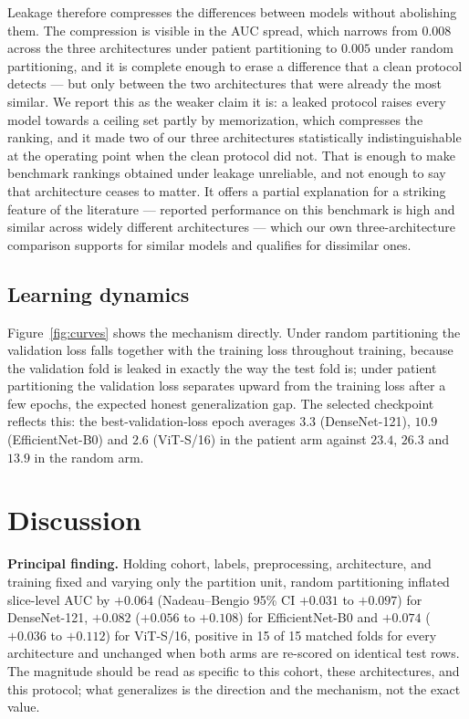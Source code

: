 \documentclass{ieeeaccess}
\begin{document}
Leakage therefore compresses the differences between models without abolishing them. The compression
is visible in the AUC spread, which narrows from $0.008$ across the three architectures under patient
partitioning to $0.005$ under random partitioning, and it is complete enough to erase a difference
that a clean protocol detects --- but only between the two architectures that were already the most
similar. We report this as the weaker claim it is: a leaked protocol raises every model towards a
ceiling set partly by memorization, which compresses the ranking, and it made two of our three
architectures statistically indistinguishable at the operating point when the clean protocol did not.
That is enough to make benchmark rankings obtained under leakage unreliable, and not enough to say
that architecture ceases to matter. It offers a partial explanation for a striking feature of the
literature --- reported performance on this benchmark is high and similar across widely different
architectures --- which our own three-architecture comparison supports for similar models and
qualifies for dissimilar ones.

\subsection{Learning dynamics}

Figure~\ref{fig:curves} shows the mechanism directly. Under random partitioning the validation loss
falls together with the training loss throughout training, because the validation fold is leaked in
exactly the way the test fold is; under patient partitioning the validation loss separates upward
from the training loss after a few epochs, the expected honest generalization gap. The selected
checkpoint reflects this: the best-validation-loss epoch averages $3.3$ (DenseNet-121), $10.9$
(EfficientNet-B0) and $2.6$ (ViT-S/16) in the patient arm against $23.4$, $26.3$ and $13.9$ in the
random arm.

\section{Discussion}
\textbf{Principal finding.} Holding cohort, labels, preprocessing, architecture, and training fixed
and varying only the partition unit, random partitioning inflated slice-level AUC by $+0.064$
(Nadeau--Bengio 95\% CI $+0.031$ to $+0.097$) for DenseNet-121, $+0.082$ ($+0.056$ to $+0.108$)
for EfficientNet-B0 and $+0.074$ ($+0.036$ to $+0.112$) for ViT-S/16, positive in 15 of 15 matched
folds for every architecture and unchanged when
both arms are re-scored on identical test rows. The magnitude should be read as specific to this
cohort, these architectures, and this protocol; what generalizes is the direction and the mechanism,
not the exact value.
\end{document}

